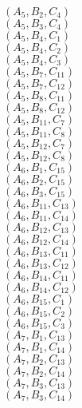 \documentclass[14pt]{article}
\begin{document}
    $({A}_{5}, {B}_{2}, {C}_{4}) $ \\ 
    $({A}_{5}, {B}_{3}, {C}_{4}) $ \\ 
    $({A}_{5}, {B}_{4}, {C}_{1}) $ \\ 
    $({A}_{5}, {B}_{4}, {C}_{2}) $ \\ 
    $({A}_{5}, {B}_{4}, {C}_{3}) $ \\ 
    $({A}_{5}, {B}_{7}, {C}_{11}) $ \\ 
    $({A}_{5}, {B}_{7}, {C}_{12}) $ \\ 
    $({A}_{5}, {B}_{8}, {C}_{11}) $ \\ 
    $({A}_{5}, {B}_{8}, {C}_{12}) $ \\ 
    $({A}_{5}, {B}_{11}, {C}_{7}) $ \\ 
    $({A}_{5}, {B}_{11}, {C}_{8}) $ \\ 
    $({A}_{5}, {B}_{12}, {C}_{7}) $ \\ 
    $({A}_{5}, {B}_{12}, {C}_{8}) $ \\ 
    $({A}_{6}, {B}_{1}, {C}_{15}) $ \\ 
    $({A}_{6}, {B}_{2}, {C}_{15}) $ \\ 
    $({A}_{6}, {B}_{3}, {C}_{15}) $ \\ 
    $({A}_{6}, {B}_{11}, {C}_{13}) $ \\ 
    $({A}_{6}, {B}_{11}, {C}_{14}) $ \\ 
    $({A}_{6}, {B}_{12}, {C}_{13}) $ \\ 
    $({A}_{6}, {B}_{12}, {C}_{14}) $ \\ 
    $({A}_{6}, {B}_{13}, {C}_{11}) $ \\ 
    $({A}_{6}, {B}_{13}, {C}_{12}) $ \\ 
    $({A}_{6}, {B}_{14}, {C}_{11}) $ \\ 
    $({A}_{6}, {B}_{14}, {C}_{12}) $ \\ 
    $({A}_{6}, {B}_{15}, {C}_{1}) $ \\ 
    $({A}_{6}, {B}_{15}, {C}_{2}) $ \\ 
    $({A}_{6}, {B}_{15}, {C}_{3}) $ \\ 
    $({A}_{7}, {B}_{1}, {C}_{13}) $ \\ 
    $({A}_{7}, {B}_{1}, {C}_{14}) $ \\ 
    $({A}_{7}, {B}_{2}, {C}_{13}) $ \\ 
    $({A}_{7}, {B}_{2}, {C}_{14}) $ \\ 
    $({A}_{7}, {B}_{3}, {C}_{13}) $ \\ 
    $({A}_{7}, {B}_{3}, {C}_{14}) $ \\ 
\end{document}
